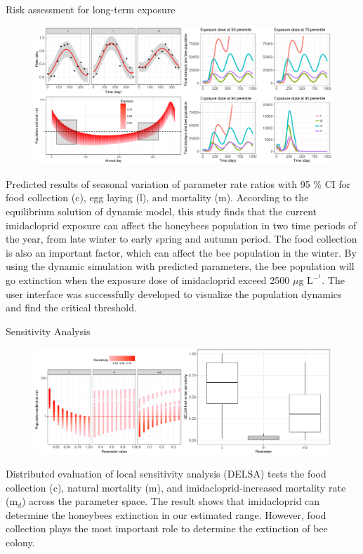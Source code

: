 \documentclass[final,t]{beamer}
\begin{document}
\begin{frame}[fragile]
\begin{columns}[t]
    \begin{column}{0.38\linewidth}
      \begin{block}{Risk assessment for long-term exposure}
      \begin{figure}[htb]
      \includegraphics[width=.95\columnwidth]{fig5}
      \end{figure}
      Predicted results of seasonal variation of parameter rate ratios with 95 \% CI for food collection (c), egg laying (l), and mortality (m). According to the equilibrium solution of dynamic model, this study finds that the current imidacloprid exposure can affect the honeybees population in two time periods of the year, from late winter to early spring and autumn period. The food collection is also an important factor, which can affect the bee population in the winter. By using the dynamic simulation with predicted parameters, the bee population will go extinction when the exposure dose of imidacloprid exceed 2500 $\mu$g L$^-^1$. The user interface was successfully developed to visualize the population dynamics and find the critical threshold.
      \end{block}
      
      \begin{block}{Sensitivity Analysis}
      \begin{figure}[htb]
      \includegraphics[width=.95\columnwidth]{fig6}
      \end{figure}
      Distributed evaluation of local sensitivity analysis (DELSA) tests the food collection (c), natural mortality (m), and imidacloprid-increased mortality rate (m$_d$) across the parameter space. The result shows that imidacloprid can determine the honeybees extinction in our estimated range. However, food collection plays the most important role to determine the extinction of bee colony.
      \end{block} 
      

\end{column}
\end{columns}
\end{frame}
\end{document}
